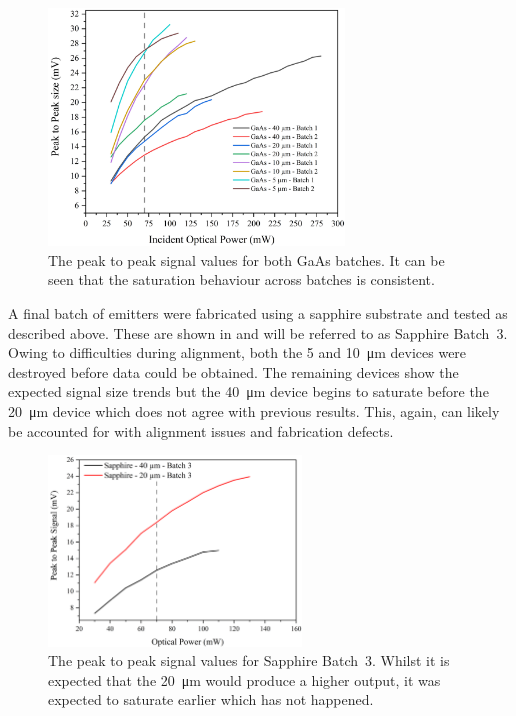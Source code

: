 \begin{figure}[h]
    \centering
    \includegraphics[width=0.7\textwidth]{Figures/Misc/SysDev/OptGaAsBothG.png}
    \captionsetup{font = footnotesize, justification = centering}
    \caption[The Peak to Peak Signal Values for both GaAs Batches - Combined]{The peak to peak signal values for both GaAs batches. It can be seen that the saturation behaviour across batches is consistent.}
    \label{fig:gaasboth2}
\end{figure}

A final batch of emitters were fabricated using a sapphire substrate and tested as described above. These are shown in  and will be referred to as Sapphire Batch~3. Owing to difficulties during alignment, both the 5 and \SI{10}{\micro\metre} devices were destroyed before data could be obtained. The remaining devices show the expected signal size trends but the \SI{40}{\micro\metre} device begins to saturate before the \SI{20}{\micro\metre} device which does not agree with previous results. This, again, can likely be accounted for with alignment issues and fabrication defects.

\begin{figure}[h!t]%
    \centering
    \includegraphics[width=0.6\textwidth]{Figures/Misc/SysDev/OptSapphBatch3.png}
    \captionsetup{font = footnotesize, justification = centering}
    \caption[The Peak to Peak Signal Values for Sapphire Batch~3]{The peak to peak signal values for Sapphire Batch~3. Whilst it is expected that the \SI{20}{\micro\metre} would produce a higher output, it was expected to saturate earlier which has not happened.}
    \label{fig:sapphbatch3}
\end{figure}

